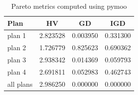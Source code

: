 \begin{table}[h!]
\centering
\begin{tabular}{lccc}
\hline
Plan & HV & GD & IGD \\
\hline
plan 1 & 2.823528 & 0.003950 & 0.331300 \\
plan 2 & 1.726779 & 0.825623 & 0.690362 \\
plan 3 & 2.938342 & 0.014369 & 0.059793 \\
plan 4 & 2.691811 & 0.052983 & 0.462743 \\
all plans & 2.986250 & 0.000000 & 0.000000 \\
\hline
\end{tabular}
\caption{Pareto metrics computed using pymoo}
\end{table}
